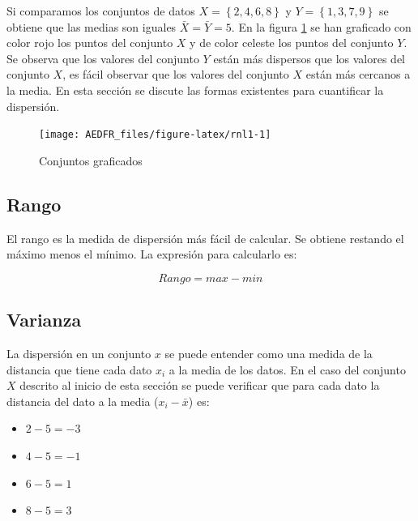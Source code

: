 \documentclass[letterpaper,]{book}
\providecommand{\tightlist}{%
  \setlength{\itemsep}{0pt}\setlength{\parskip}{0pt}}
\begin{document}
Si comparamos los conjuntos de datos \(X=\left\{ 2,4,6,8 \right\}\) y \(Y=\left\{1,3,7,9\right\}\) se obtiene que las medias son iguales \(\bar{X}= \bar{Y}=5\). En la figura \ref{fig:rnl1} se han graficado con color rojo los puntos del conjunto \(X\) y de color celeste los puntos del conjunto \(Y\). Se observa que los valores del conjunto \(Y\) están más dispersos que los valores del conjunto \(X\), es fácil observar que los valores del conjunto \(X\) están más cercanos a la media. En esta sección se discute las formas existentes para cuantificar la dispersión.

\begin{figure}[h!]

{\centering \texttt{[image: AEDFR\_files/figure-latex/rnl1-1]} 

}

\caption{Conjuntos graficados}\label{fig:rnl1}
\end{figure}

\hypertarget{rango}{%
\subsection{Rango}\label{rango}}

El rango es la medida de dispersión más fácil de calcular. Se obtiene restando el máximo menos el mínimo. La expresión para calcularlo es:

\begin{equation} 
  Rango = max - min
  \label{eq:rg}
\end{equation}

\hypertarget{varianza}{%
\subsection{Varianza}\label{varianza}}

La dispersión en un conjunto \(x\) se puede entender como una medida de la distancia que tiene cada dato \(x_i\) a la media de los datos. En el caso del conjunto \(X\) descrito al inicio de esta sección se puede verificar que para cada dato la distancia del dato a la media (\(x_i-\bar{x}\)) es:

\begin{itemize}
\tightlist
\item
  \(2-5=-3\)
\item
  \(4-5=-1\)
\item
  \(6-5=1\)
\item
  \(8-5=3\)
\end{itemize}
\end{document}
